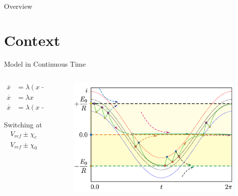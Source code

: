 
\begin{frame}{Overview}
	\tableofcontents
\end{frame}

\section{Context}

\begin{frame}{Model in Continuous Time}

	\begin{columns}
		\begin{column}{.3 \textwidth}
			\begin{align*}
				\overset{\cdot}{x} & = \lambda (x - 1) \quad & \text{if } & K_{F} = +1 \\
				\overset{\cdot}{x} & = \lambda x       \quad & \text{if } & K_{F} = 0  \\
				\overset{\cdot}{x} & = \lambda (x + 1) \quad & \text{if } & K_{F} = -1
			\end{align*}

			Switching at
			\begin{align*}
				V_{ref} \pm \chi_{c} \\
				V_{ref} \pm \chi_{0}
			\end{align*}
		\end{column}
		\begin{column}{.7 \textwidth}
			\begin{figure}
				\includegraphics[width=0.7 \textwidth]{Figs/continuous_model.png}
			\end{figure}
		\end{column}
	\end{columns}
\end{frame}


